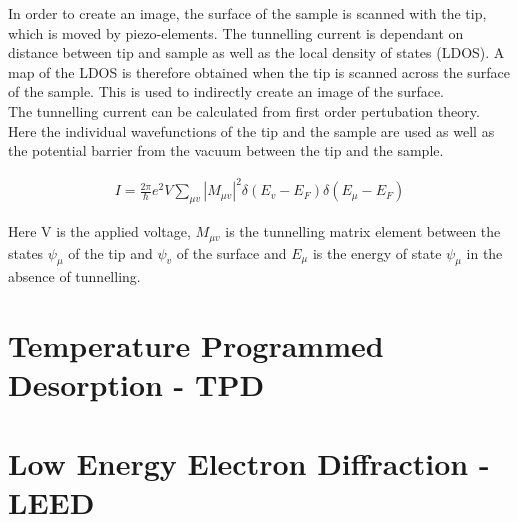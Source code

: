 In order to create an image, the surface of the sample is scanned with the tip, which is moved by piezo-elements. The tunnelling current is dependant on distance between tip and sample as well as the local density of states (LDOS). A map of the LDOS is therefore obtained when the tip is scanned across the surface of the sample. This is used to indirectly create an image of the surface.\\

The tunnelling current can be calculated from first order pertubation theory. Here the individual wavefunctions of the tip and the sample are used as well as the potential barrier from the vacuum between the tip and the sample.

\begin{align}
  I = \frac{2\pi}{\hbar}e^2 V \sum_{\mu v}|M_{\mu v}|^2 \delta (E_v - E_F)\delta (E_{\mu}-E_F)
\end{align}

Here V is the applied voltage, $M_{\mu v}$ is the tunnelling matrix element between the states $\psi _{\mu}$ of the tip and $\psi _v$ of the surface and $E_{\mu}$ is the energy of state $\psi _{\mu}$ in the absence of tunnelling.

\section{Temperature Programmed Desorption - TPD}


\section{Low Energy Electron Diffraction - LEED}
